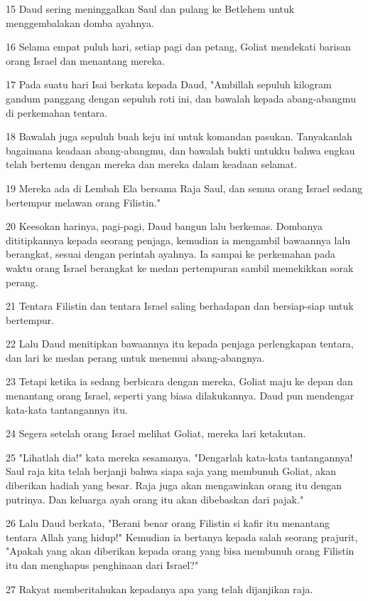 \par 15 Daud sering meninggalkan Saul dan pulang ke Betlehem untuk menggembalakan domba ayahnya.
\par 16 Selama empat puluh hari, setiap pagi dan petang, Goliat mendekati barisan orang Israel dan menantang mereka.
\par 17 Pada suatu hari Isai berkata kepada Daud, "Ambillah sepuluh kilogram gandum panggang dengan sepuluh roti ini, dan bawalah kepada abang-abangmu di perkemahan tentara.
\par 18 Bawalah juga sepuluh buah keju ini untuk komandan pasukan. Tanyakanlah bagaimana keadaan abang-abangmu, dan bawalah bukti untukku bahwa engkau telah bertemu dengan mereka dan mereka dalam keadaan selamat.
\par 19 Mereka ada di Lembah Ela bersama Raja Saul, dan semua orang Israel sedang bertempur melawan orang Filistin."
\par 20 Keesokan harinya, pagi-pagi, Daud bangun lalu berkemas. Dombanya dititipkannya kepada seorang penjaga, kemudian ia mengambil bawaannya lalu berangkat, sesuai dengan perintah ayahnya. Ia sampai ke perkemahan pada waktu orang Israel berangkat ke medan pertempuran sambil memekikkan sorak perang.
\par 21 Tentara Filistin dan tentara Israel saling berhadapan dan bersiap-siap untuk bertempur.
\par 22 Lalu Daud menitipkan bawaannya itu kepada penjaga perlengkapan tentara, dan lari ke medan perang untuk menemui abang-abangnya.
\par 23 Tetapi ketika ia sedang berbicara dengan mereka, Goliat maju ke depan dan menantang orang Israel, seperti yang biasa dilakukannya. Daud pun mendengar kata-kata tantangannya itu.
\par 24 Segera setelah orang Israel melihat Goliat, mereka lari ketakutan.
\par 25 "Lihatlah dia!" kata mereka sesamanya. "Dengarlah kata-kata tantangannya! Saul raja kita telah berjanji bahwa siapa saja yang membunuh Goliat, akan diberikan hadiah yang besar. Raja juga akan mengawinkan orang itu dengan putrinya. Dan keluarga ayah orang itu akan dibebaskan dari pajak."
\par 26 Lalu Daud berkata, "Berani benar orang Filistin si kafir itu menantang tentara Allah yang hidup!" Kemudian ia bertanya kepada salah seorang prajurit, "Apakah yang akan diberikan kepada orang yang bisa membunuh orang Filistin itu dan menghapus penghinaan dari Israel?"
\par 27 Rakyat memberitahukan kepadanya apa yang telah dijanjikan raja.
